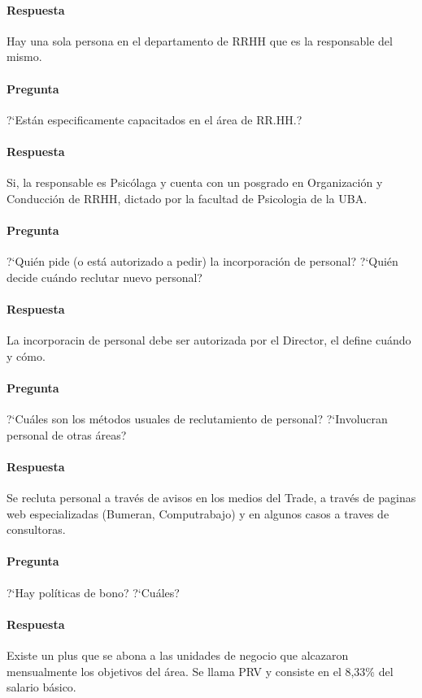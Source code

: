 \documentclass[12pt,a4paper,spanish]{article}
\begin{document}
	\paragraph{Respuesta}
	Hay una sola persona en el departamento de RRHH que es la responsable del mismo.

	\paragraph{Pregunta}
	 ?`Est\'an especificamente capacitados en el \'area de RR.HH.?
	\paragraph{Respuesta}
	Si, la responsable es Psic\'olaga y cuenta con un posgrado en Organizaci\'on y Conducci\'on de RRHH, dictado por la facultad de Psicologia de la UBA.

	\paragraph{Pregunta}
	 ?`Qui\'en pide (o est\'a autorizado a pedir) la incorporaci\'on de personal?  ?`Qui\'en decide cu\'ando reclutar nuevo personal?
	\paragraph{Respuesta}
	La incorporacin de personal debe ser autorizada por el Director, el define cu\'ando y c\'omo.
	
	\paragraph{Pregunta}
	 ?`Cu\'ales son los m\'etodos usuales de reclutamiento de personal?  ?`Involucran personal de otras \'areas?
	\paragraph{Respuesta}
	Se recluta personal a trav\'es de avisos en los medios del Trade, a trav\'es de paginas web especializadas (Bumeran, Computrabajo) y en algunos casos a traves de consultoras.
	
	\paragraph{Pregunta}
	 ?`Hay pol\'iticas de bono?  ?`Cu\'ales?
	\paragraph{Respuesta}
	Existe un plus que se abona a las unidades de negocio que alcazaron mensualmente los objetivos del \'area. Se llama PRV y consiste en el 8,33\% del salario b\'asico.
	
\end{document}
